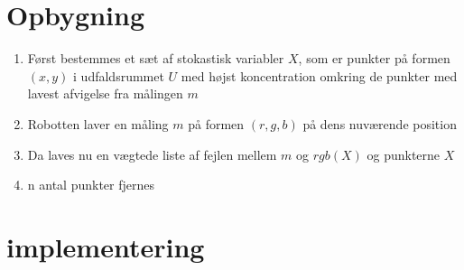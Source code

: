 \documentclass[../../SRP.tex]{subfiles}
\begin{document}
\section{Opbygning}

\begin{enumerate}
  \item Først bestemmes et sæt af stokastisk variabler $X$, som er punkter på formen $(x,y)$ i udfaldsrummet $U$ med højst koncentration omkring de punkter med lavest afvigelse fra målingen $m$

  \item Robotten laver en måling $m$ på formen $(r,g,b)$ på dens nuværende position

  \item Da laves nu en vægtede liste af fejlen mellem $m$ og $rgb(X)$ og punkterne $X$

  \item n antal punkter fjernes
\end{enumerate}

\section{implementering}
\end{document}
